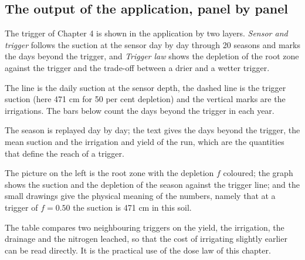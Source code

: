 \subsection{The output of the application, panel by panel}
The trigger of Chapter 4 is shown in the application by two layers. \emph{Sensor and trigger} follows the suction at the sensor day by day through 20 seasons and marks the days beyond the trigger, and \emph{Trigger law} shows the depletion of the root zone against the trigger and the trade-off between a drier and a wetter trigger.

The line is the daily suction at the sensor depth, the dashed line is the trigger suction (here 471 cm for 50 per cent depletion) and the vertical marks are the irrigations. The bars below count the days beyond the trigger in each year.


The season is replayed day by day; the text gives the days beyond the trigger, the mean suction and the irrigation and yield of the run, which are the quantities that define the reach of a trigger.


The picture on the left is the root zone with the depletion $f$ coloured; the graph shows the suction and the depletion of the season against the trigger line; and the small drawings give the physical meaning of the numbers, namely that at a trigger of $f=0.50$ the suction is 471 cm in this soil.


The table compares two neighbouring triggers on the yield, the irrigation, the drainage and the nitrogen leached, so that the cost of irrigating slightly earlier can be read directly. It is the practical use of the dose law of this chapter.


